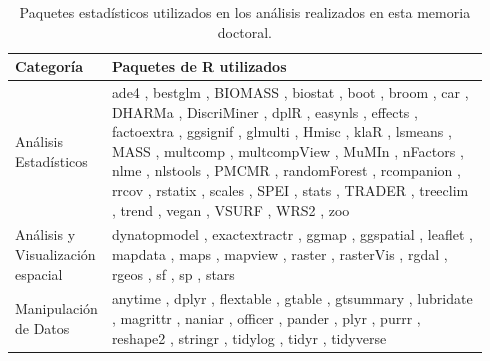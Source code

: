 \begin{table}
\caption{Paquetes estadísticos utilizados en los análisis realizados en esta memoria doctoral.}\label{tab:metodos:paquetes}
\centering
\scriptsize
\begin{tabular}{>{\RaggedRight}m{0.14\linewidth}>{\RaggedRight}m{0.8\linewidth}}
\textbf{Categoría} & \textbf{Paquetes de R utilizados} \\
\toprule
Análisis Estadísticos & ade4 \autocite{ade4}, bestglm \autocite{bestglm}, BIOMASS \autocite{BIOMASS}, biostat \autocite{biostat}, boot \autocite{boot}, broom \autocite{broom}, car \autocite{car}, DHARMa \autocite{DHARMa}, DiscriMiner \autocite{DiscriMiner}, dplR \autocite{dplR}, easynls \autocite{easynls}, effects \autocite{effects}, factoextra \autocite{factoextra}, ggsignif \autocite{ggsignif}, glmulti \autocite{glmulti}, Hmisc \autocite{Hmisc}, klaR \autocite{klaR}, lsmeans \autocite{lsmeans}, MASS \autocite{MASS}, multcomp \autocite{multcomp}, multcompView \autocite{multcompView}, MuMIn \autocite{MuMIn}, nFactors \autocite{nFactors}, nlme \autocite{nlme}, nlstools \autocite{nlstools}, PMCMR \autocite{PMCMR}, randomForest \autocite{randomForest}, rcompanion \autocite{rcompanion}, rrcov \autocite{rrcov}, rstatix \autocite{rstatix}, scales \autocite{scales}, SPEI \autocite{SPEI}, stats \autocite{base}, TRADER \autocite{TRADER}, treeclim \autocite{ZangBiondi2015TreeclimPackage}, trend \autocite{trend}, vegan \autocite{vegan}, VSURF \autocite{VSURF}, WRS2 \autocite{MairWilcox2020RobustStatistical}, zoo \autocite{zoo} \\ \midrule
Análisis y Visualización espacial & dynatopmodel \autocite{Metcalfeetal2018DynatopmodelImplementation}, exactextractr \autocite{exactextractr}, ggmap \autocite{ggmap}, ggspatial \autocite{ggspatial}, leaflet \autocite{leaflet}, mapdata \autocite{mapdata}, maps \autocite{maps}, mapview \autocite{mapview}, raster \autocite{raster}, rasterVis \autocite{rasterVis}, rgdal \autocite{rgdal}, rgeos \autocite{rgeos}, sf \autocite{sf}, sp \autocite{sp}, stars \autocite{stars} \\ \midrule
Manipulación de Datos & anytime \autocite{anytime}, dplyr \autocite{dplyr}, flextable \autocite{flextable}, gtable \autocite{gtable}, gtsummary \autocite{gtsummary}, lubridate \autocite{lubridate}, magrittr \autocite{magrittr}, naniar \autocite{naniar}, officer \autocite{officer}, pander \autocite{pander}, plyr \autocite{plyr}, purrr \autocite{purrr}, reshape2 \autocite{reshape2}, stringr \autocite{stringr}, tidylog \autocite{tidylog}, tidyr \autocite{tidyr}, tidyverse \autocite{tidyverse} \\ \midrule

\end{tabular}
\end{table}
